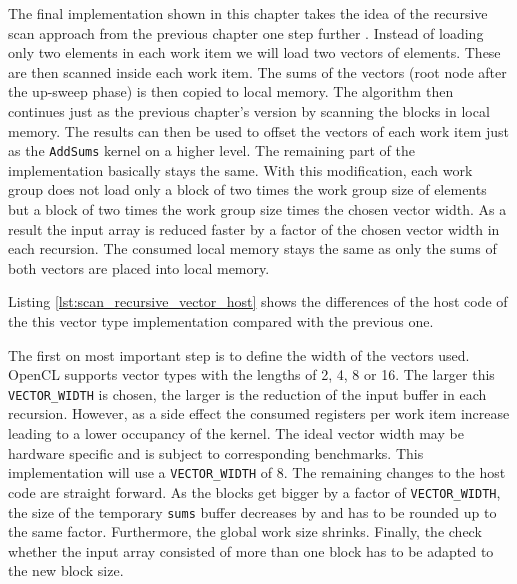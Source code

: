 The final implementation shown in this chapter takes the idea of the recursive scan approach from the previous chapter one step further \cite[ch. 39.2.5]{gpu_gems_3_chapter_39}. Instead of loading only two elements in each work item we will load two vectors of elements. These are then scanned inside each work item. The sums of the vectors (root node after the up-sweep phase) is then copied to local memory. The algorithm then continues just as the previous chapter's version by scanning the blocks in local memory. The results can then be used to offset the vectors of each work item just as the \lstinline!AddSums! kernel on a higher level. The remaining part of the implementation basically stays the same.
With this modification, each work group does not load only a block of two times the work group size of elements but a block of two times the work group size times the chosen vector width. As a result the input array is reduced faster by a factor of the chosen vector width in each recursion. The consumed local memory stays the same as only the sums of both vectors are placed into local memory.

Listing \ref{lst:scan_recursive_vector_host} shows the differences of the host code of the this vector type implementation compared with the previous one.



The first on most important step is to define the width of the vectors used. OpenCL supports vector types with the lengths of 2, 4, 8 or 16. The larger this \lstinline!VECTOR_WIDTH! is chosen, the larger is the reduction of the input buffer in each recursion. However, as a side effect the consumed registers per work item increase leading to a lower occupancy of the kernel. The ideal vector width may be hardware specific and is subject to corresponding benchmarks. This implementation will use a \lstinline!VECTOR_WIDTH! of 8.
The remaining changes to the host code are straight forward. As the blocks get bigger by a factor of \lstinline!VECTOR_WIDTH!, the size of the temporary \lstinline!sums! buffer decreases by and has to be rounded up to the same factor. Furthermore, the global work size shrinks. Finally, the check whether the input array consisted of more than one block has to be adapted to the new block size.

